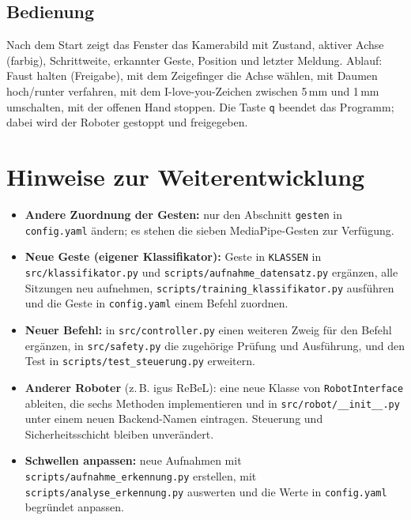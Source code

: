\documentclass[11pt,a4paper]{article}
\newcommand{\datei}[1]{\texttt{#1}}
\begin{document}
\subsection{Bedienung}

Nach dem Start zeigt das Fenster das Kamerabild mit Zustand, aktiver Achse (farbig),
Schrittweite, erkannter Geste, Position und letzter Meldung. Ablauf: Faust halten (Freigabe),
mit dem Zeigefinger die Achse wählen, mit Daumen hoch/runter verfahren, mit dem I-love-you-Zeichen
zwischen 5\,mm und 1\,mm umschalten, mit der offenen Hand stoppen. Die Taste \texttt{q} beendet
das Programm; dabei wird der Roboter gestoppt und freigegeben.

\section{Hinweise zur Weiterentwicklung}

\begin{itemize}
  \item \textbf{Andere Zuordnung der Gesten:} nur den Abschnitt \texttt{gesten} in \datei{config.yaml}
        ändern; es stehen die sieben MediaPipe-Gesten zur Verfügung.
  \item \textbf{Neue Geste (eigener Klassifikator):} Geste in \texttt{KLASSEN} in
        \datei{src/klassifikator.py} und \datei{scripts/aufnahme\_datensatz.py} ergänzen, alle
        Sitzungen neu aufnehmen, \datei{scripts/training\_klassifikator.py} ausführen und die Geste
        in \datei{config.yaml} einem Befehl zuordnen.
  \item \textbf{Neuer Befehl:} in \datei{src/controller.py} einen weiteren Zweig für den Befehl
        ergänzen, in \datei{src/safety.py} die zugehörige Prüfung und Ausführung, und den Test in
        \datei{scripts/test\_steuerung.py} erweitern.
  \item \textbf{Anderer Roboter} (z.\,B. igus ReBeL): eine neue Klasse von
        \texttt{RobotInterface} ableiten, die sechs Methoden implementieren und in
        \datei{src/robot/\_\_init\_\_.py} unter einem neuen Backend-Namen eintragen. Steuerung und
        Sicherheitsschicht bleiben unverändert.
  \item \textbf{Schwellen anpassen:} neue Aufnahmen mit \datei{scripts/aufnahme\_erkennung.py}
        erstellen, mit \datei{scripts/analyse\_erkennung.py} auswerten und die Werte in
        \datei{config.yaml} begründet anpassen.
\end{itemize}
\end{document}
